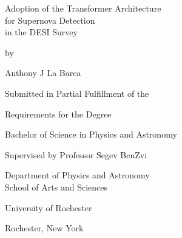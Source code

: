 \begin{titlepage}
  \vspace*{\fill}

  \begin{center}
    {\Huge Adoption of the Transformer Architecture \\for Supernova Detection\\ in the DESI Survey\par
    }

    \bigskip%
    by

    \bigskip%
    Anthony J La Barca


    \bigskip\bigskip\bigskip\bigskip%
    Submitted in Partial Fulfillment of the

    \bigskip%
    Requirements for the Degree

    \bigskip%
    Bachelor of Science in Physics and Astronomy


    \bigskip\bigskip\bigskip\bigskip%
    Supervised by Professor Segev BenZvi

    \bigskip\bigskip%
    Department of Physics and Astronomy\\
    School of Arts and Sciences


    \bigskip\bigskip\bigskip\bigskip%
    University of Rochester

    \bigskip%
    Rochester, New York


    \bigskip\bigskip\bigskip{}
  \end{center}

  \vspace*{\fill}
\end{titlepage}
